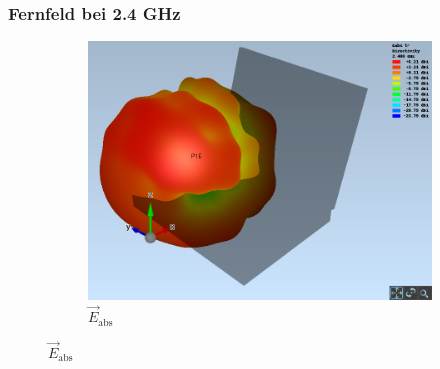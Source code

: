 \newpage
\subsubsection{Fernfeld bei 2.4 GHz}

\begin{figure}[h!]
	\centering
	\begin{subfigure}[b]{0.75\textwidth}
		\includegraphics[width=1\textwidth]{../fig/plt/crazy_stuff_l4_pcb_v2c_laptop_1a_105_2ghz4_3d_farfield_eabs_xyz.png}
		\caption{$\vec{E}_{\mathrm{abs}}$}
	\end{subfigure}
	
	\vspace{3mm}
	

\end{figure}
